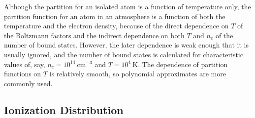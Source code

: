Although the partition for an isolated atom is a function of temperature only,
the partition function for
an atom in an atmosphere is a function of both the temperature and the electron
density, because of the direct dependence on $T$ of the Boltzmann
factors and the indirect dependence on both $T$ and $n_e$ of the number
of bound states. However, the later dependence is weak enough that it is
usually ignored, and the number of bound states is calculated for
characteristic values of, say, $n_e = 10^{14}\:\mathrm{cm^{-3}}$ and $T
= 10^4\:\mathrm{K}$. 
The dependence of partition functions on $T$ is relatively smooth, so polynomial
approximates are more commonly used.

\newslide

\subsection{Ionization Distribution}

